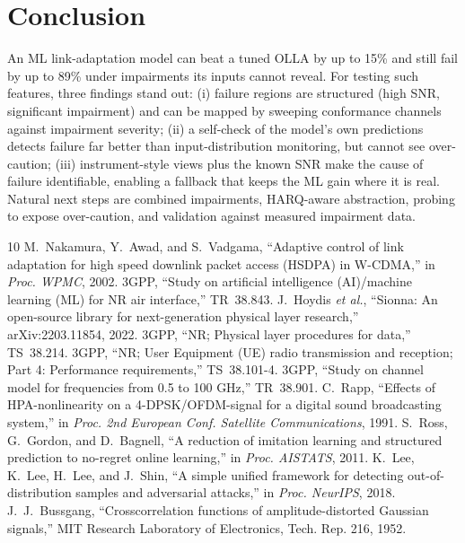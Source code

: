 \documentclass[conference]{IEEEtran}
\begin{document}
\section{Conclusion}
An ML link-adaptation model can beat a tuned OLLA by up to 15\% and still fail by up to 89\%
under impairments its inputs cannot reveal. For testing such features, three findings stand
out: (i) failure regions are structured (high SNR, significant impairment) and can be mapped
by sweeping conformance channels against impairment severity; (ii) a self-check of the model's
own predictions detects failure far better than input-distribution monitoring, but cannot
see over-caution; (iii) instrument-style views plus the known SNR make the cause of failure
identifiable, enabling a fallback that keeps the ML gain where it is real. Natural next steps
are combined impairments, HARQ-aware abstraction, probing to expose over-caution, and
validation against measured impairment data.

\begin{thebibliography}{10}
 M.~Nakamura, Y.~Awad, and S.~Vadgama, ``Adaptive control of link
adaptation for high speed downlink packet access (HSDPA) in W-CDMA,'' in \emph{Proc. WPMC},
2002.
 3GPP, ``Study on artificial intelligence (AI)/machine learning (ML) for NR
air interface,'' TR~38.843.
 J.~Hoydis \emph{et al.}, ``Sionna: An open-source library for next-generation
physical layer research,'' arXiv:2203.11854, 2022.
 3GPP, ``NR; Physical layer procedures for data,'' TS~38.214.
 3GPP, ``NR; User Equipment (UE) radio transmission and reception; Part 4:
Performance requirements,'' TS~38.101-4.
 3GPP, ``Study on channel model for frequencies from 0.5 to 100 GHz,''
TR~38.901.
 C.~Rapp, ``Effects of HPA-nonlinearity on a 4-DPSK/OFDM-signal for a
digital sound broadcasting system,'' in \emph{Proc. 2nd European Conf. Satellite
Communications}, 1991.
 S.~Ross, G.~Gordon, and D.~Bagnell, ``A reduction of imitation learning and
structured prediction to no-regret online learning,'' in \emph{Proc. AISTATS}, 2011.
 K.~Lee, K.~Lee, H.~Lee, and J.~Shin, ``A simple unified framework for
detecting out-of-distribution samples and adversarial attacks,'' in \emph{Proc. NeurIPS},
2018.
 J.~J.~Bussgang, ``Crosscorrelation functions of amplitude-distorted
Gaussian signals,'' MIT Research Laboratory of Electronics, Tech. Rep. 216, 1952.
\end{thebibliography}
\end{document}
